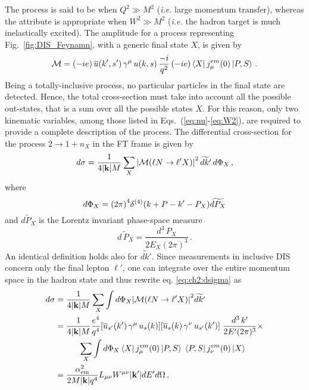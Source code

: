 The process  is said to be  when $Q^2 \gg M^2$ (\textit{i.e.} large momentum transfer), whereas the attribute  is appropriate when $W^2 \gg M^2$ (\textit{i.e.} the hadron target is much inelastically excited). The amplitude for a process representing Fig.~\ref{fig:DIS_Feynamn}, with a generic final state $X$, is given by
\begin{equation}
    \mathcal{M} = (-i e) \, \overline{u}(k',s') \, \gamma^{\mu}\, u(k,s) \, \frac{-i}{q^2} \, (-i e)\bra{X} j_{\mu}^{em} \qty(0) \ket{P,S} \,.
    \label{eq:ch2:amplitude}
\end{equation}
Being a totally-inclusive process, no particular particles in the final state are detected. Hence, the total cross-section must take into account all the possible out-states, that is a sum over all the possible states $X$. For this reason, only two kinematic variables, among those listed in Eqs.~(\ref{eq:nu}-\ref{eq:W2}), are required to provide a complete description of the process. The differential cross-section for the process $2 \rightarrow 1 + n_X$ in the FT frame is given by 
\begin{equation}
    d\sigma = \frac{1}{4 \qty|\vb{k}| M} \sum_{X} \qty| \mathcal{M} \qty( \ell N \rightarrow \ell'X ) |^2 \, \widetilde{d k'} \,  d\Phi_X \, ,
    \label{eq:ch2:dsigma}
\end{equation}
where
\begin{equation}
        d \Phi_X = \qty(2\pi)^4 \delta^{(4)} \qty( k + P - k' - P_X ) \widetilde{dP_X}  
\end{equation}
and $\widetilde{dP_X}$ is the Lorentz invariant phase-space measure
\begin{equation}
    \widetilde{d\, P_X} = \frac{d^3 \, P_X}{2 E_X (2\pi)^3} \,.
\end{equation}
An identical definition holds also for $\widetilde{d k'}$.  Since measurements in inclusive DIS concern only the final lepton $\ell'$, one can integrate over the entire momentum space in the hadron state and thus rewrite eq. \eqref{eq:ch2:dsigma} as
\begin{equation}
    \begin{split}
        d\sigma &= \frac{1}{4 \qty|\vb{k}| M} \sum_{X} \int d\Phi_X \qty| \mathcal{M} \qty( \ell N \rightarrow \ell'X ) |^2 \widetilde{d k'}  \\
        & = \frac{1}{4 \qty|\vb{k}| M}  \frac{e^4}{q^4} \qty[ \overline{u}_{s'}(k') \, \gamma^{\mu}\, u_s(k)] \qty[\overline{u}_{s}(k) \,\gamma^{\nu}\, u_{s'}(k') ] \; \frac{d^3 \, k'}{2 E' (2\pi)^3} \times \\
        & \hspace{10mm} \sum_{X} \int d\Phi_X  \bra{X} j_{\mu}^{em} \qty(0) \ket{P,S} \; \bra{P,S} j_{\nu}^{em} \qty(0) \ket{X}  \\
        & = \frac{\alpha_{\textrm{em}}^2}{2 M \qty|\vb{k}| q^4} L_{\mu\nu} W^{\mu\nu} \qty|\vb{k}'| dE' d\Omega \,,
        \label{eq:ch2:dsigma2}
    \end{split}
\end{equation}
